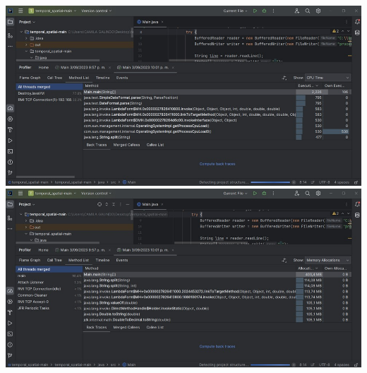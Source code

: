 \documentclass[a4paper,twocolumn,10pt]{article}
\begin{document}
\includegraphics[width=0.9\linewidth]{Lenovo AMD 3020e/Method List CPU Time 2.jpeg}
\includegraphics[width=0.9\linewidth]{Lenovo AMD 3020e/Method List Memory Allocation 2.jpeg}
\end{document}

